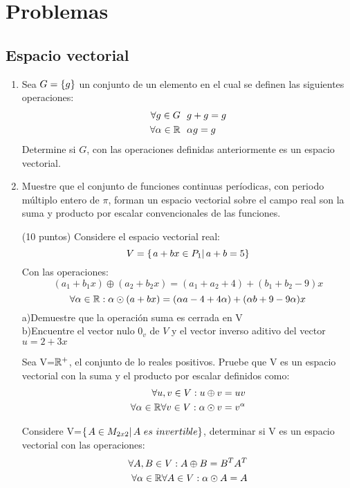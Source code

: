 \section{Problemas}
\subsection{Espacio vectorial}
\begin{enumerate}[1.]
\item Sea $G= \left\{g \right\} $ un conjunto de un elemento en el cual se definen las siguientes operaciones:
\begin{align*}
\forall g \in G\ \  &g+g=g\\
\forall \alpha\in \mathbb{R}\ \ &\alpha g=g \\
\end{align*}
Determine si $G$, con las operaciones definidas anteriormente es un espacio vectorial.

\item Muestre que el conjunto de funciones continuas períodicas, con periodo múltiplo entero de $\pi$, forman un espacio vectorial sobre el campo real son la suma y producto por escalar convencionales de las funciones.


\begin{prob}
(10 puntos) Considere el espacio vectorial real:
\[V=\left\{ \left. a+bx \in P_1\right| a+b=5 \right\}\]
Con las operaciones:
 \[(a_1+b_1 x)\oplus(a_2+b_2 x)=(a_1+a_2+4)+(b_1+b_2-9)x\]
 \[ \forall \alpha \in \mathbb{R}:  \alpha\odot (a+b x)=(\alpha a-4+4\alpha)+(\alpha b+9-9\alpha)x\]
 a)Demuestre que la operaci\'on suma es cerrada en V~\\
 b)Encuentre el vector nulo $0_v$ de $V$ y el vector inverso aditivo del vector $u=2+3x$
\end{prob}

\begin{prob}
Sea V=$\mathbb{R}^+$, el conjunto de lo reales positivos. Pruebe que V es un espacio vectorial con la suma y el producto por escalar definidos como:
\begin{align*}
\forall u, v \in V: u\oplus v=uv\\
\forall \alpha \in \mathbb{R} \forall v \in V: \alpha\odot v =v^\alpha
\end{align*}
\end{prob}

\begin{prob}
Considere V=$\llaves{A\in M_{2x2}}{A\ es\ invertible}$, determinar si V es un espacio vectorial con las operaciones:
\begin{align*}
\forall A, B \in V: A\oplus B=B^T A^T\\
\forall \alpha \in \mathbb{R} \forall A \in V: \alpha\odot A =A
\end{align*}
\end{prob}



\end{enumerate}
